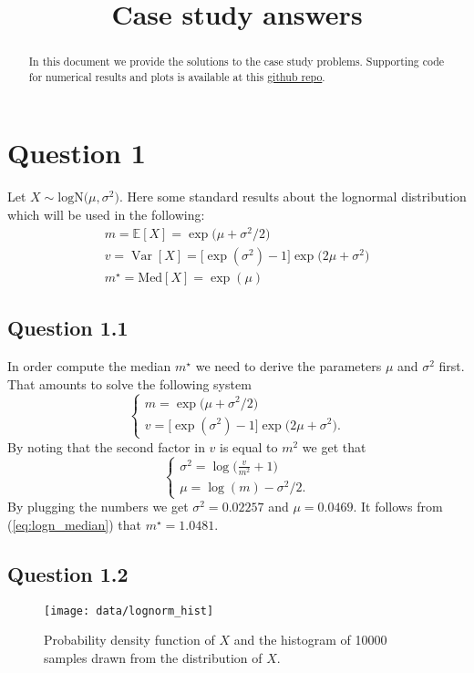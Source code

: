 \documentclass[12pt, a4paper]{article}
\title{Case study answers}
\author{}
\theoremstyle{problemstyle}
\newcommand{\Var}[1]{\operatorname{Var}\left[#1\right]}
\begin{document}
\maketitle

\begin{abstract}
	In this document we provide the solutions to the case study problems. Supporting code for numerical results and plots is available at this \href{https://github.com/skiamu/case-study}{github repo}.
\end{abstract}

\section{Question 1}
Let $X \sim \text{logN}\big(\mu, \sigma^2\big)$. Here some standard results about the lognormal distribution which will be used in the following:
\begin{gather}
m =  \mathbb{E}[X]  = \exp\Big(\mu+\sigma^2/2\Big) \\
v=  \Var{X} =  \Big[\exp(\sigma^2)-1\Big]\exp\Big(2\mu+\sigma^2\Big)\\\label{eq:logn_median}
m^{\star} =   \text{Med}[X] = \exp(\mu) 
\end{gather}
\subsection{Question 1.1}
In order compute the median $m^{\star}$ we need to derive the parameters $\mu$ and $\sigma^2$ first. That amounts to solve the following system
\begin{equation}
\begin{cases}
m = \exp\Big(\mu+\sigma^2/2\Big)\\
v = \Big[\exp(\sigma^2)-1\Big]\exp\Big(2\mu+\sigma^2\Big).
\end{cases}
\end{equation}
By noting that the second factor in $v$ is equal to $m^2$ we get that 
\begin{equation}
\begin{cases}
\sigma^2=\log\Big(\frac{v}{m^2}+1\Big)\\
\mu = \log(m) - \sigma^2/2.
\end{cases}
\end{equation}
By plugging the numbers we get $\sigma^2=0.02257$ and $\mu = 0.0469 $. It follows from (\ref{eq:logn_median}) that $m^{\star}=1.0481$.

\subsection{Question 1.2}
\begin{figure}[h]
	\centering
	\texttt{[image: data/lognorm\_hist]}
	\caption{Probability density function of $X$ and the histogram of 10000 samples drawn from the distribution of $X$.}
\end{figure}
\end{document}
